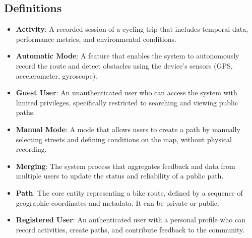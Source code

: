 \subsection{Definitions}
\begin{itemize}
    \item \textbf{Activity}: A recorded session of a cycling trip that includes temporal data, performance metrics, and environmental conditions.
    \item \textbf{Automatic Mode}: A feature that enables the system to autonomously record the route and detect obstacles using the device's sensors (GPS, accelerometer, gyroscope).
    \item \textbf{Guest User}: An unauthenticated user who can access the system with limited privileges, specifically restricted to searching and viewing public paths.
    \item \textbf{Manual Mode}: A mode that allows users to create a path by manually selecting streets and defining conditions on the map, without physical recording.
    \item \textbf{Merging}: The system process that aggregates feedback and data from multiple users to update the status and reliability of a public path.
    \item \textbf{Path}: The core entity representing a bike route, defined by a sequence of geographic coordinates and metadata. It can be private or public.
    \item \textbf{Registered User}: An authenticated user with a personal profile who can record activities, create paths, and contribute feedback to the community.
\end{itemize}

